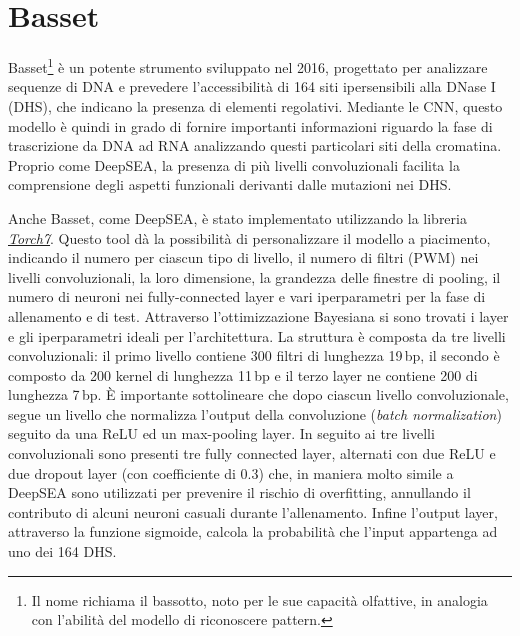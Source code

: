 \section{Basset}\label{sec:Basset}
% 
Basset\footnote{Il nome richiama il bassotto, noto per le sue capacità olfattive, in analogia con l'abilità del modello di riconoscere pattern.} è un potente strumento sviluppato nel 2016, progettato per analizzare sequenze di DNA e prevedere l'accessibilità di 164 siti ipersensibili alla DNase I (\acs{DHS}), che indicano la presenza di elementi regolativi. Mediante le \acs{CNN}, questo modello è quindi in grado di fornire importanti informazioni riguardo la fase di trascrizione da \acs{DNA} ad \acs{RNA} analizzando questi particolari siti della cromatina. Proprio come DeepSEA, la presenza di più livelli convoluzionali facilita la comprensione degli aspetti funzionali derivanti dalle mutazioni nei \acs{DHS}.

Anche Basset, come DeepSEA, è stato implementato utilizzando la libreria \href{https://github.com/torch/torch7}{\textsl{Torch7}}. Questo tool dà la possibilità di personalizzare il modello a piacimento, indicando il numero per ciascun tipo di livello, il numero di filtri (\acs{PWM}) nei livelli convoluzionali, la loro dimensione, la grandezza delle finestre di pooling, il numero di neuroni nei fully-connected layer e vari iperparametri per la fase di allenamento e di test. Attraverso l'ottimizzazione Bayesiana si sono trovati i layer e gli iperparametri ideali per l'architettura. La struttura è composta da tre livelli convoluzionali: il primo livello contiene 300 filtri di lunghezza 19\,bp, il secondo è composto da 200 kernel di lunghezza 11\,bp e il terzo layer ne contiene 200 di lunghezza 7\,bp. È importante sottolineare che dopo ciascun livello convoluzionale, segue un livello che normalizza l'output della convoluzione (\textit{batch normalization}) seguito da una \acs{ReLU} ed un max-pooling layer. In seguito ai tre livelli convoluzionali sono presenti tre fully connected layer, alternati con due \acs{ReLU} e due dropout layer (con coefficiente di 0.3) che, in maniera molto simile a DeepSEA sono utilizzati per prevenire il rischio di overfitting, annullando il contributo di alcuni neuroni casuali durante l'allenamento. Infine l'output layer, attraverso la funzione sigmoide, calcola la probabilità che l'input appartenga ad uno dei 164 \acs{DHS}.

